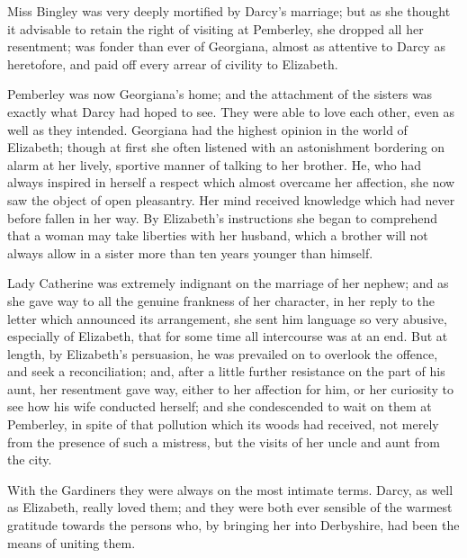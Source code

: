 \documentclass[10pt]{book}
\begin{document}
   Miss Bingley was very deeply mortified by Darcy’s marriage; but as she
thought it advisable to retain the right of visiting at Pemberley, she
dropped all her resentment; was fonder than ever of Georgiana, almost as
attentive to Darcy as heretofore, and paid off every arrear of civility
to Elizabeth.
  

   Pemberley was now Georgiana’s home; and the attachment of the sisters
was exactly what Darcy had hoped to see. They were able to love each
other, even as well as they intended. Georgiana had the highest opinion
in the world of Elizabeth; though at first she often listened with an
astonishment bordering on alarm at her lively, sportive manner of
talking to her brother. He, who had always inspired in herself a respect
which almost overcame her affection, she now saw the object of open
pleasantry. Her mind received knowledge which had never before fallen in
her way. By Elizabeth’s instructions she began to comprehend that a
woman may take liberties with her husband, which a brother will not
always allow in a sister more than ten years younger than himself.
  

   Lady Catherine was extremely indignant on the marriage of her nephew;
and as she gave way to all the genuine frankness of her character, in
her reply to the letter which announced its arrangement, she sent him
language so very abusive, especially of Elizabeth, that for some time
all intercourse was at an end. But at length, by Elizabeth’s persuasion,
he was prevailed on to overlook the offence, and seek a reconciliation;
and, after a little further resistance on the part of his aunt, her
resentment gave way, either to her affection for him, or her curiosity
to see how his wife conducted herself; and she condescended to wait on
them at Pemberley, in spite of that pollution which its woods had
received, not merely from the presence of such a mistress, but the
visits of her uncle and aunt from the city.
  

   With the Gardiners they were always on the most intimate terms. Darcy,
as well as Elizabeth, really loved them; and they were both ever
sensible of the warmest gratitude towards the persons who, by bringing
her into Derbyshire, had been the means of uniting them.
  
\end{document}
